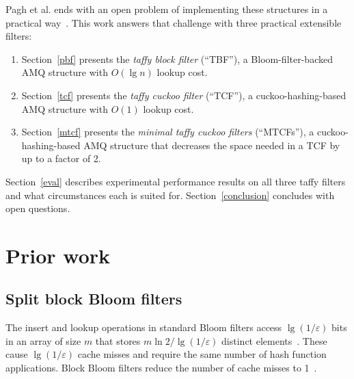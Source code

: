 \documentclass[letterpaper,twocolumn,10pt]{article}
\newcommand{\etal}{et al.}
\begin{document}

Pagh \etal{} ends with an open problem of implementing these structures in a practical way~\cite{psw}.
This work answers that challenge with three practical extensible filters:

\begin{enumerate}
\item Section~\ref{pbf}  presents the {\em taffy block filter}           (``TBF''),   a Bloom-filter-backed  AMQ structure with $O(\lg n)$ lookup cost.
\item Section~\ref{tcf}  presents the {\em taffy cuckoo filter}          (``TCF''),   a cuckoo-hashing-based AMQ structure with $O(1)$ lookup cost.
\item Section~\ref{mtcf} presents the {\em minimal taffy cuckoo filters} (``MTCFs''), a cuckoo-hashing-based AMQ structure that decreases the space needed in a TCF by up to a factor of 2.
\end{enumerate}

Section~\ref{eval} describes experimental performance results on all three taffy filters and what circumstances each is suited for. %
Section~\ref{conclusion} concludes with open questions.


\section{Prior work}

\subsection{Split block Bloom filters}



The insert and lookup operations in standard Bloom filters access $\lg (1/\varepsilon)$ bits in an array of size $m$ that stores $m \ln 2 / \lg(1/\varepsilon)$ distinct elements~\cite{bloom-original}.
These cause $\lg (1/\varepsilon)$ cache misses and require the same number of hash function applications.
Block Bloom filters reduce the number of cache misses to 1~\cite{block-bloom}.
\end{document}
